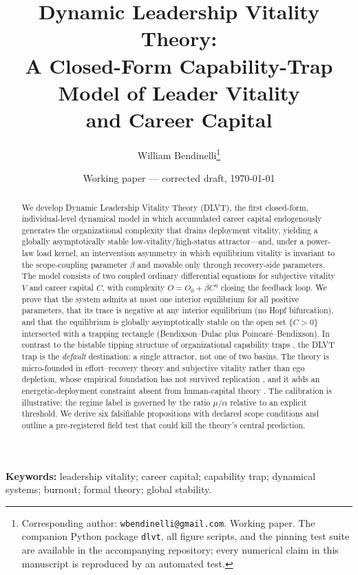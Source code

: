 \documentclass[11pt,a4paper]{article}
\title{Dynamic Leadership Vitality Theory:\\
A Closed-Form Capability-Trap Model of Leader Vitality\\
and Career Capital}
\author{William Bendinelli\thanks{%
Corresponding author: \texttt{wbendinelli@gmail.com}.
Working paper. The companion Python package \texttt{dlvt}, all figure
scripts, and the pinning test suite are available in the accompanying
repository; every numerical claim in this manuscript is reproduced by an
automated test.}}
\date{Working paper --- corrected draft, \today}
\theoremstyle{definition}
\theoremstyle{remark}
\numberwithin{equation}{section}
\begin{document}
\maketitle

\begin{abstract}
\noindent
We develop Dynamic Leadership Vitality Theory (DLVT), the first closed-form,
individual-level dynamical model in which accumulated career capital
endogenously generates the organizational complexity that drains deployment
vitality, yielding a globally asymptotically stable low-vitality/high-status
attractor---and, under a power-law load kernel, an intervention asymmetry in
which equilibrium vitality is invariant to the scope-coupling parameter
$\beta$ and movable only through recovery-side parameters. The model consists
of two coupled ordinary differential equations for subjective vitality $V$ and
career capital $C$, with complexity $O = O_0 + \beta C^{\eta}$ closing the
feedback loop. We prove that the system admits at most one interior
equilibrium for all positive parameters, that its trace is negative at any
interior equilibrium (no Hopf bifurcation), and that the equilibrium is
globally asymptotically stable on the open set $\{C>0\}$ intersected with a
trapping rectangle (Bendixson--Dulac plus Poincar\'e--Bendixson). In contrast
to the bistable tipping structure of organizational capability traps
\citep{repenning2002capability,rahmandad2016capability}, the DLVT trap is the
\emph{default} destination: a single attractor, not one of two basins. The
theory is micro-founded in effort--recovery theory \citep{meijman1998effort}
and subjective vitality \citep{ryan1997subjective} rather than ego depletion,
whose empirical foundation has not survived replication
\citep{hagger2010ego,carter2015series,vohs2021multisite}, and it adds an
energetic-deployment constraint absent from human-capital theory
\citep{becker1993human}. The calibration is illustrative; the regime label is
governed by the ratio $\mu/\alpha$ relative to an explicit threshold. We
derive six falsifiable propositions with declared scope conditions and outline
a pre-registered field test that could kill the theory's central prediction.
\end{abstract}

\vspace{0.5em}
\noindent\textbf{Keywords:} leadership vitality; career capital; capability
trap; dynamical systems; burnout; formal theory; global stability.







\end{document}
